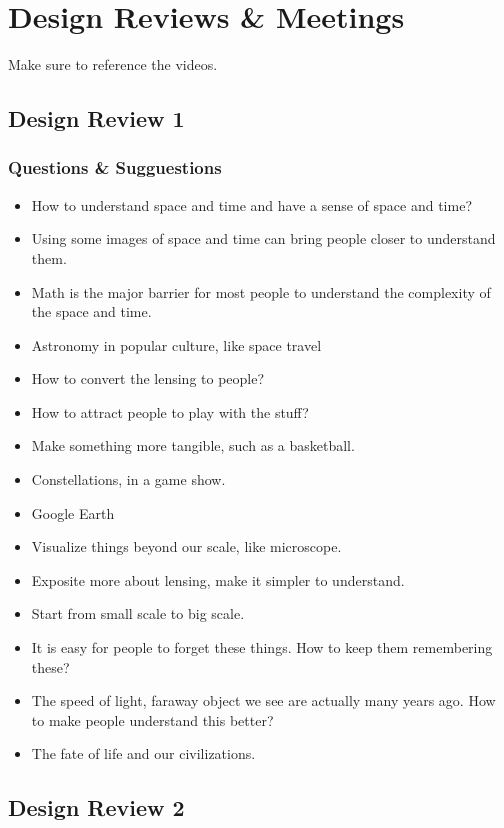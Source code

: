 \chapter{Design Reviews \& Meetings}
Make sure to reference the videos.

\section{Design Review 1}

\subsection{Questions & Sugguestions}
\begin{itemize}
\item How to understand space and time and have a sense of space and time?
\item Using some images of space and time can bring people closer to understand them.
\item Math is the major barrier for most people to understand the complexity of the space and time.
\item Astronomy in popular culture, like space travel
\item How to convert the lensing to people?
\item How to attract people to play with the stuff?
\item Make something more tangible, such as a basketball.
\item Constellations, in a game show.
\item Google Earth
\item Visualize things beyond our scale, like microscope.
\item Exposite more about lensing, make it simpler to understand.
\item Start from small scale to big scale.
\item It is easy for people to forget these things. How to keep them remembering these?
\item The speed of light, faraway object we see are actually many years ago. How to make people understand this better?
\item The fate of life and our civilizations.
\end{itemize}

\section{Design Review 2}

